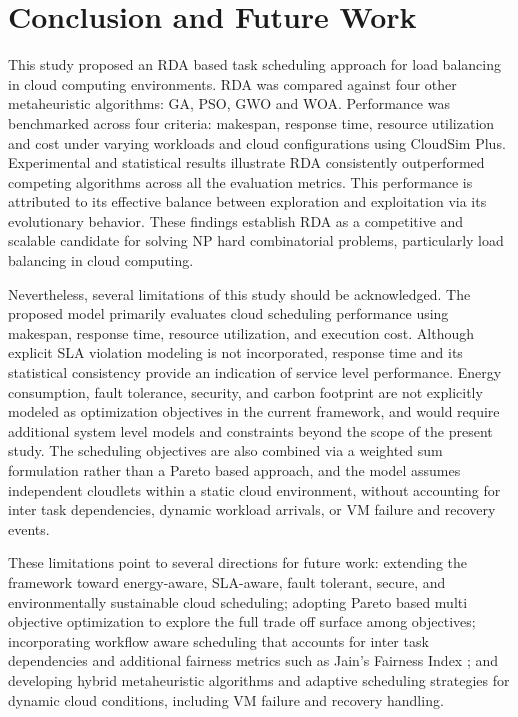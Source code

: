 \documentclass[pdflatex,sn-mathphys-num]{sn-jnl}%
\begin{document}
\FloatBarrier
\section{Conclusion and Future Work}\label{sec7}

This study proposed an RDA based task scheduling approach for load balancing in cloud computing environments. RDA was compared against four other metaheuristic algorithms: GA, PSO, GWO and WOA. Performance was benchmarked across four criteria: makespan, response time, resource utilization and cost under varying workloads and cloud configurations using CloudSim Plus. Experimental and statistical results illustrate RDA consistently outperformed competing algorithms across all the evaluation metrics. This performance is attributed to its effective balance between exploration and exploitation via its evolutionary behavior. These findings establish RDA as a competitive and scalable candidate for solving NP hard  combinatorial problems, particularly load balancing in cloud computing.

Nevertheless, several limitations of this study should be acknowledged. The proposed model primarily evaluates cloud scheduling performance using makespan, response time, resource utilization, and execution cost. Although explicit SLA violation modeling is not incorporated, response time and its statistical consistency provide an indication of service level performance. Energy consumption, fault tolerance, security, and carbon footprint are not explicitly modeled as optimization objectives in the current framework, and would require additional system level models and constraints beyond the scope of the present study. The scheduling objectives are also combined via a weighted sum formulation rather than a Pareto based approach, and the model assumes independent cloudlets within a static cloud environment, without accounting for inter task dependencies, dynamic workload arrivals, or VM failure and recovery events.

These limitations point to several directions for future work: extending the framework toward energy-aware, SLA-aware, fault tolerant, secure, and environmentally sustainable cloud scheduling; adopting Pareto based multi objective optimization to explore the full trade off surface among objectives; incorporating workflow aware scheduling that accounts for inter task dependencies and additional fairness metrics such as Jain's Fairness Index \cite{Jain_fairness_index}; and developing hybrid metaheuristic algorithms and adaptive scheduling strategies for dynamic cloud conditions, including VM failure and recovery handling.
\end{document}
